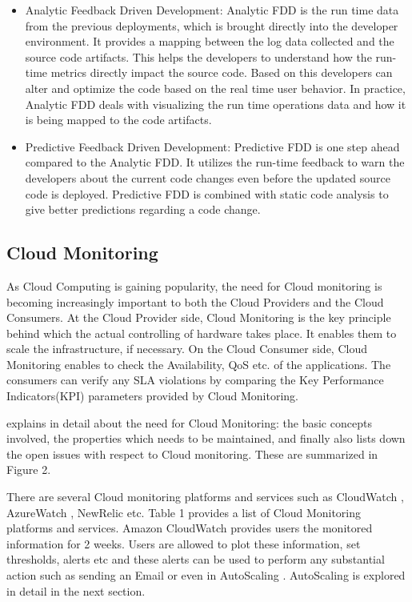 \documentclass[article,type=msc,colorback,12pt,accentcolor=tud7b,table]{tudthesis}
\begin{document}
		\begin{itemize}
			\item{Analytic Feedback Driven Development: }
			Analytic FDD is the run time data from the previous deployments, which is brought directly into the developer environment. It provides a mapping between the log data collected and the source code artifacts. This helps the developers to understand how the run-time metrics directly impact the source code. Based on this developers can alter and optimize the code based on the real time user behavior. In practice, Analytic FDD deals with visualizing the run time operations data and how it is being mapped to the code artifacts. 
			
			\item{Predictive Feedback Driven Development: }
			Predictive FDD is one step ahead compared to the Analytic FDD. It utilizes the run-time feedback to warn the developers about the current code changes even before the updated source code is deployed. Predictive FDD is combined with static code analysis to give better predictions regarding a code change. 
		\end{itemize}
	
	\subsection{Cloud Monitoring}
 	
 	As Cloud Computing is gaining popularity, the need for Cloud monitoring is becoming increasingly important to  both the Cloud Providers and the Cloud Consumers. At the Cloud Provider side, Cloud Monitoring is the key principle behind which the actual controlling of hardware takes place. It enables them to scale the infrastructure, if necessary. On the Cloud Consumer side, Cloud Monitoring enables to check the Availability, QoS etc. of the applications. The consumers can verify any SLA violations by comparing the Key Performance Indicators(KPI) parameters provided by Cloud Monitoring.
 	
 	\cite{aceto2013cloud} explains in detail about the need for Cloud Monitoring: the basic concepts involved, the properties which needs to be maintained, and finally also lists down the open issues with respect to Cloud monitoring. These are summarized in Figure 2.
	
	There are several Cloud monitoring platforms and services such as CloudWatch \cite{cloudwatchdev} \cite{cloudwatch}, AzureWatch \cite{azurewatch} , NewRelic \cite{newrelic} etc. Table 1 provides a list of Cloud Monitoring platforms and services. Amazon CloudWatch provides users the monitored information for 2 weeks. Users are allowed to plot these information, set thresholds, alerts etc and these alerts can be used to perform any substantial action such as sending an Email or even in AutoScaling \cite{aas}. AutoScaling is explored in detail in the next section. 
	
\end{document}
